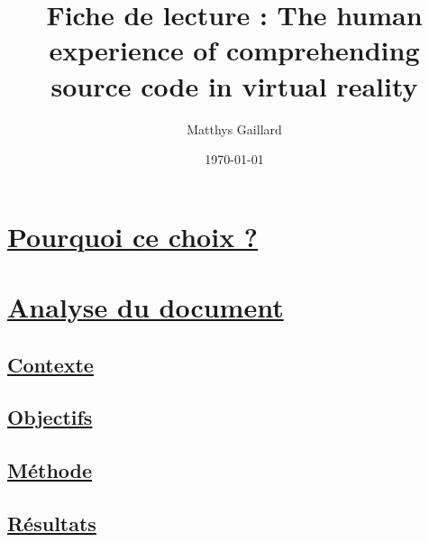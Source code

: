 \documentclass[a4paper,10pt, oneside]{article}
\title{Fiche de lecture : The human experience of comprehending source code in virtual reality}
\author{Matthys Gaillard}
\date{\today}
\begin{document}
\maketitle
\section{\ul{Pourquoi ce choix ?}}
\section{\ul{Analyse du document}}
\subsection{\ul{Contexte}}
\subsection{\ul{Objectifs}}
\subsection{\ul{Méthode}}
\subsection{\ul{Résultats}}
\newpage

 
\end{document}
